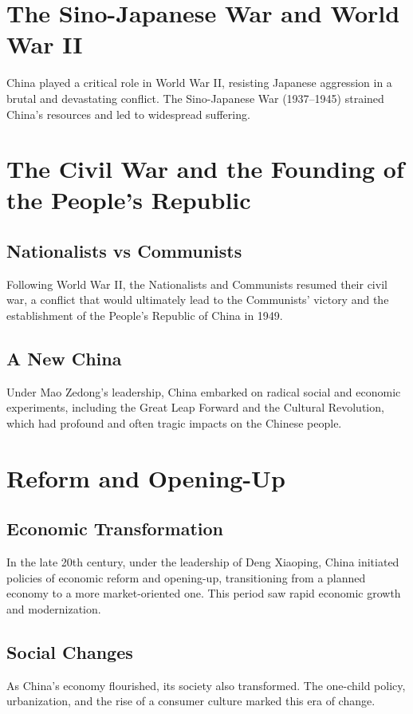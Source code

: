 \documentclass[a4paper,12pt]{book}
\begin{document}
\section{The Sino-Japanese War and World War II}
\label{sec:sino-japanese-war}
China played a critical role in World War II, resisting Japanese aggression in a brutal and devastating conflict. The Sino-Japanese War (1937–1945) strained China's resources and led to widespread suffering.

\section{The Civil War and the Founding of the People's Republic}
\label{sec:civil-war-prc}
\subsection{Nationalists vs Communists}
Following World War II, the Nationalists and Communists resumed their civil war, a conflict that would ultimately lead to the Communists' victory and the establishment of the People's Republic of China in 1949.

\subsection{A New China}
Under Mao Zedong's leadership, China embarked on radical social and economic experiments, including the Great Leap Forward and the Cultural Revolution, which had profound and often tragic impacts on the Chinese people.

\section{Reform and Opening-Up}
\label{sec:reform-opening-up}
\subsection{Economic Transformation}
In the late 20th century, under the leadership of Deng Xiaoping, China initiated policies of economic reform and opening-up, transitioning from a planned economy to a more market-oriented one. This period saw rapid economic growth and modernization.

\subsection{Social Changes}
As China's economy flourished, its society also transformed. The one-child policy, urbanization, and the rise of a consumer culture marked this era of change.
\end{document}
